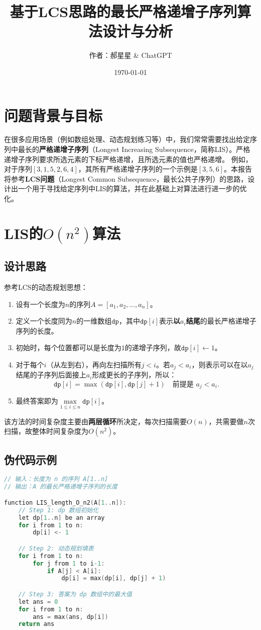 \documentclass[UTF8]{ctexart}
\title{基于LCS思路的最长严格递增子序列算法设计与分析}
\author{作者：郝星星 \& ChatGPT}
\date{\today}
\begin{document}
\maketitle

\section{问题背景与目标}
在很多应用场景（例如数组处理、动态规划练习等）中，我们常常需要找出给定序列中最长的\textbf{严格递增子序列}（Longest Increasing Subsequence，简称LIS）。严格递增子序列要求所选元素的下标严格递增，且所选元素的值也严格递增。  
例如，对于序列$[3,1,5,2,6,4]$，其所有严格递增子序列的一个示例是$[3,5,6]$。本报告将参考\textbf{LCS问题}（Longest Common Subsequence，最长公共子序列）的思路，设计出一个用于寻找给定序列中LIS的算法，并在此基础上对算法进行进一步的优化。

\section{LIS的\texorpdfstring{$O(n^2)$}{O(n2)}算法}
\subsection{设计思路}
参考LCS的动态规划思想：  
\begin{enumerate}
    \item 设有一个长度为$n$的序列$A = [a_1, a_2, \ldots, a_n]$。
    \item 定义一个长度同为$n$的一维数组$\texttt{dp}$，其中$\texttt{dp}[i]$表示\textbf{以$a_i$结尾}的最长严格递增子序列的长度。
    \item 初始时，每个位置都可以是长度为$1$的递增子序列，故$\texttt{dp}[i] \leftarrow 1$。
    \item 对于每个$i$（从左到右），再向左扫描所有$j < i$。若$a_j < a_i$，则表示可以在以$a_j$结尾的子序列后面接上$a_i$形成更长的子序列，所以：
    \[
        \texttt{dp}[i] = \max(\texttt{dp}[i], \texttt{dp}[j] + 1) \quad \text{前提是 } a_j < a_i.
    \]
    \item 最终答案即为$\max\limits_{1 \le i \le n}\texttt{dp}[i]$。
\end{enumerate}

该方法的时间复杂度主要由\textbf{两层循环}所决定，每次扫描需要$O(n)$，共需要做$n$次扫描，故整体时间复杂度为$O(n^2)$。

\subsection{伪代码示例}
\begin{lstlisting}[language=C]
// 输入：长度为 n 的序列 A[1..n]
// 输出：A 的最长严格递增子序列的长度

function LIS_length_O_n2(A[1..n]):
    // Step 1: dp 数组初始化
    let dp[1..n] be an array
    for i from 1 to n:
        dp[i] <- 1

    // Step 2: 动态规划填表
    for i from 1 to n:
        for j from 1 to i-1:
            if A[j] < A[i]:
                dp[i] = max(dp[i], dp[j] + 1)

    // Step 3: 答案为 dp 数组中的最大值
    let ans = 0
    for i from 1 to n:
        ans = max(ans, dp[i])
    return ans
\end{lstlisting}
\end{document}
